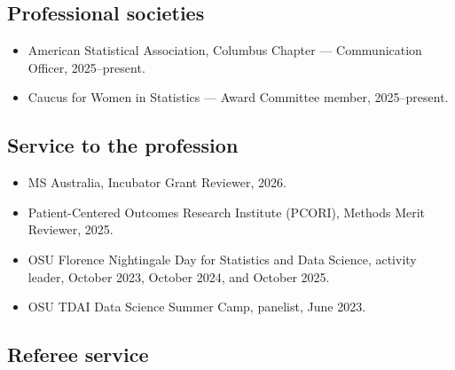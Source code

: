 \documentclass[
  10pt,
  letterpaper,
]{article}
\providecommand{\tightlist}{%
  \setlength{\itemsep}{0pt}\setlength{\parskip}{0pt}}
\begin{document}
\subsection{Professional societies}\label{professional-societies}

\begin{itemize}
\tightlist
\item
  American Statistical Association, Columbus Chapter --- Communication
  Officer, 2025--present.
\item
  Caucus for Women in Statistics --- Award Committee member,
  2025--present.
\end{itemize}

\subsection{Service to the profession}\label{service-to-the-profession}

\begin{itemize}
\tightlist
\item
  MS Australia, Incubator Grant Reviewer, 2026.
\item
  Patient-Centered Outcomes Research Institute (PCORI), Methods Merit
  Reviewer, 2025.
\item
  OSU Florence Nightingale Day for Statistics and Data Science, activity
  leader, October 2023, October 2024, and October 2025.
\item
  OSU TDAI Data Science Summer Camp, panelist, June 2023.
\end{itemize}

\subsection{Referee service}\label{referee-service}
\end{document}
